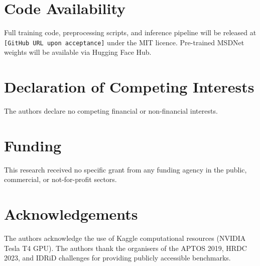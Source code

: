 \documentclass[review,12pt]{elsarticle}
\begin{document}
\section*{Code Availability}

Full training code, preprocessing scripts, and inference pipeline will be
released at \texttt{[GitHub URL upon acceptance]} under the MIT licence.
Pre-trained MSDNet weights will be available via Hugging Face Hub.

\section*{Declaration of Competing Interests}

The authors declare no competing financial or non-financial interests.

\section*{Funding}

This research received no specific grant from any funding agency in the
public, commercial, or not-for-profit sectors.

\section*{Acknowledgements}

The authors acknowledge the use of Kaggle computational resources (NVIDIA
Tesla T4 GPU). The authors thank the organisers of the APTOS 2019, HRDC 2023,
and IDRiD challenges for providing publicly accessible benchmarks.



\end{document}
